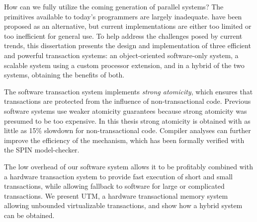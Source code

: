 
How can we fully utilize the coming generation of parallel systems?
The primitives available to today's programmers are largely
inadequate.   have been proposed as an alternative,
but current implementations are either too limited or too inefficient
for general use.  To help address the challenges posed by current
trends, this dissertation presents the design and implementation of
three efficient and powerful transaction systems: an object-oriented
software-only system, a scalable system using a custom processor
extension, and in a hybrid of the two systems, obtaining the benefits
of both.

The software transaction system implements \textit{strong atomicity},
which ensures that transactions are protected from the influence of
non-transactional code.  Previous software systems use weaker
atomicity guarantees because strong atomicity was presumed to be too
expensive.  In this thesis strong atomicity is obtained with as little
as 15\% slowdown for non-transactional code.  Compiler analyses can
further improve the efficiency of the mechanism, which has been
formally verified with the SPIN model-checker.

The low overhead of our software system allows it to be profitably
combined with a hardware transaction system to provide fast execution
of short and small transactions, while allowing fallback to
software for large or complicated transactions.  We present
UTM, a hardware transactional memory system allowing unbounded
virtualizable transactions, and show how a hybrid system can be
obtained.
